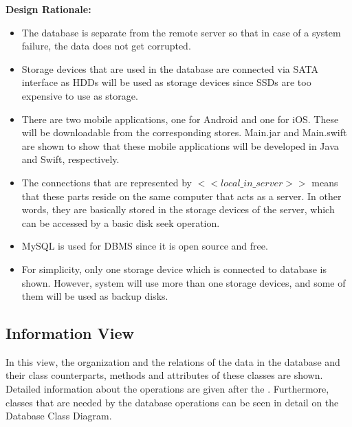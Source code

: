 \documentclass[11pt]{article}
\begin{document}
    \textbf{Design Rationale: \\}
    \begin{itemize}
        \item The database is separate from the remote server so that in case of a system failure, the data does not get corrupted.
        
        \item Storage devices that are used in the database are connected via SATA interface as HDDs will be used as storage devices since SSDs are
        too expensive to use as storage. 
        
        \item There are two mobile applications, one for Android and one for iOS. These will be downloadable from the corresponding stores. Main.jar and Main.swift 
        are shown to show that these mobile applications will be developed in Java and Swift, respectively.
        
        \item The connections that are represented by $<<local\_in\_server>>$ means that these parts reside on the same computer that acts as a server. In other words,
        they are basically stored in the storage devices of the server, which can be accessed by a basic disk seek operation.

        \item MySQL is used for DBMS since it is open source and free.
        
        \item For simplicity, only one storage device which is connected to database is shown. However, system will use more than one storage devices, and some of them
        will be used as backup disks.

    \end{itemize}

    
    \subsection{Information View}
    In this view, the organization and the relations of the data in the database and their class counterparts, methods and attributes of these classes are shown. 
    Detailed information about the operations are given after the . Furthermore, classes that are needed by the database operations can be seen 
    in detail on the Database Class Diagram. %
    
\end{document}
